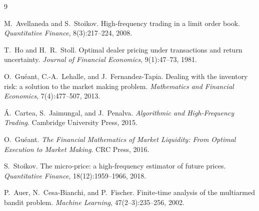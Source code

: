 \documentclass[11pt,a4paper]{article}
\begin{document}
\begin{thebibliography}{9}

M.~Avellaneda and S.~Stoikov.
\newblock High-frequency trading in a limit order book.
\newblock \emph{Quantitative Finance}, 8(3):217--224, 2008.

T.~Ho and H.~R.~Stoll.
\newblock Optimal dealer pricing under transactions and return uncertainty.
\newblock \emph{Journal of Financial Economics}, 9(1):47--73, 1981.

O.~Guéant, C.-A.~Lehalle, and J.~Fernandez-Tapia.
\newblock Dealing with the inventory risk: a solution to the market making problem.
\newblock \emph{Mathematics and Financial Economics}, 7(4):477--507, 2013.

Á.~Cartea, S.~Jaimungal, and J.~Penalva.
\newblock \emph{Algorithmic and High-Frequency Trading}.
\newblock Cambridge University Press, 2015.

O.~Guéant.
\newblock \emph{The Financial Mathematics of Market Liquidity: From Optimal Execution to Market
Making}.
\newblock CRC Press, 2016.

S.~Stoikov.
\newblock The micro-price: a high-frequency estimator of future prices.
\newblock \emph{Quantitative Finance}, 18(12):1959--1966, 2018.

P.~Auer, N.~Cesa-Bianchi, and P.~Fischer.
\newblock Finite-time analysis of the multiarmed bandit problem.
\newblock \emph{Machine Learning}, 47(2--3):235--256, 2002.

\end{thebibliography}
\end{document}
